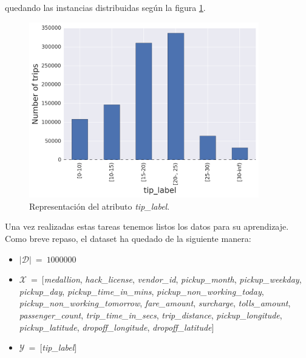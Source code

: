 \noindent

quedando las instancias distribuidas según la figura \ref{fig:5.12}.

\begin{figure}[ht]
  \centering
  \includegraphics[width=100mm]{figures/ch_05/tip_label_1.png}
  \caption{Representación del atributo \emph{tip\_label}.}
  \label{fig:5.12}
\end{figure}

\pagebreak

Una vez realizadas estas tareas tenemos listos los datos para su aprendizaje. Como breve repaso, el dataset ha quedado de la siguiente manera:

\vspace*{-5mm}

\begin{itemize}
\item[\textbullet]$|\mathcal{D}|\:=\:1000000$

\item[\textbullet]$\mathcal{X}\:=\:[$\emph{medallion}, \emph{hack\_license}, \emph{vendor\_id}, \emph{pickup\_month}, \emph{pickup\_weekday}, \emph{pickup\_day}, \emph{pickup\_time\_in\_mins}, \emph{pickup\_non\_working\_today}, \\
\emph{pickup\_non\_working\_tomorrow}, \emph{fare\_amount}, \emph{surcharge}, \emph{tolls\_amount}, \\
\emph{passenger\_count}, \emph{trip\_time\_in\_secs}, \emph{trip\_distance}, \emph{pickup\_longitude}, \\
\emph{pickup\_latitude}, \emph{dropoff\_longitude}, \emph{dropoff\_latitude}$]$

\item[\textbullet]$\mathcal{Y}\:=\:[$\emph{tip\_label}$]$
\end{itemize}

